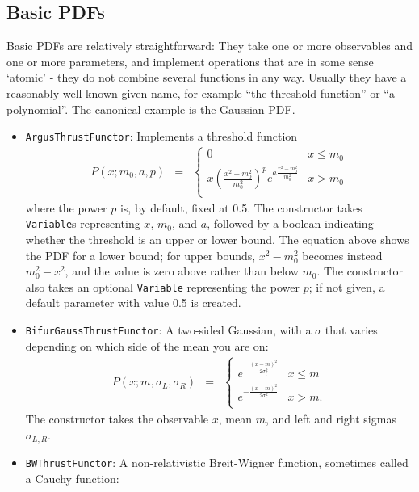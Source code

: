 \documentclass[12pt,pdflatex]{article}
\begin{document}
\subsection{Basic PDFs}

Basic PDFs are relatively straightforward: They take one or more observables
and one or more parameters, and implement operations that are in some sense
`atomic' - they do not combine several functions in any way. Usually they have
a reasonably well-known given name, for example ``the threshold function'' or ``a polynomial''. 
The canonical example is the Gaussian PDF. 

\begin{itemize}
\item \texttt{ArgusThrustFunctor}: Implements a threshold function
\begin{eqnarray}
P(x;m_0,a,p) &=& \left\{ \begin{matrix}
0 & x \le m_0 \\
x\left(\frac{x^2-m_0^2}{m_0^2}\right)^p e^{a\frac{x^2-m_0^2}{m_0^2}} & x > m_0 \\
\end{matrix}
\right. 
\end{eqnarray}
where the power $p$ is, by default, fixed at 0.5. The constructor takes \texttt{Variable}s
representing $x$, $m_0$,
and $a$, followed by a boolean indicating whether the threshold is an upper or lower
bound. The equation above shows the PDF for a lower bound; for upper bounds, $x^2-m_0^2$
becomes instead $m_0^2-x^2$, and the value is zero above rather than below $m_0$. 
The constructor also takes an optional \texttt{Variable} representing the power $p$;
if not given, a default parameter with value 0.5 is created. 
\item \texttt{BifurGaussThrustFunctor}: A two-sided Gaussian, with a $\sigma$ that
varies depending on which side of the mean you are on: 
\begin{eqnarray}
P(x;m,\sigma_L,\sigma_R) &=& \left\{ \begin{matrix}
e^{-\frac{(x-m)^2}{2\sigma_l^2}} & x \le m \\
e^{-\frac{(x-m)^2}{2\sigma_r^2}} & x > m. \\
\end{matrix}
\right. 
\end{eqnarray}
The constructor takes the observable $x$, mean $m$, and left and right sigmas
$\sigma_{L,R}$.
\item \texttt{BWThrustFunctor}: A non-relativistic Breit-Wigner function,
sometimes called a Cauchy function:

\end{itemize}
\end{document}
